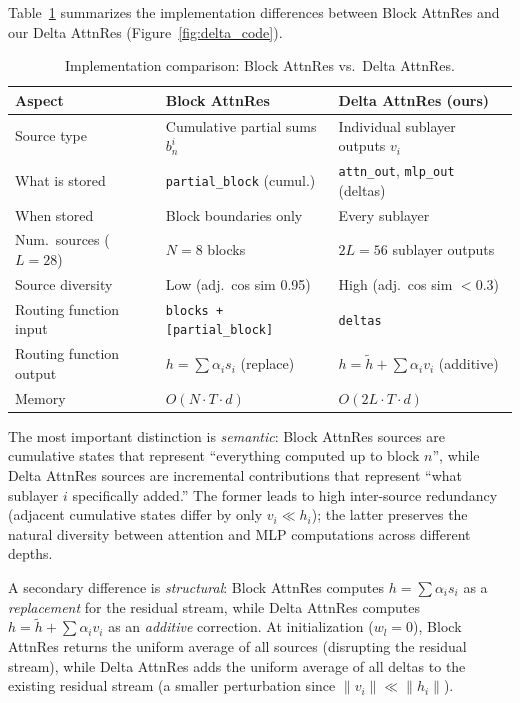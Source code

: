 \documentclass{article}
\begin{document}
Table~\ref{tab:diff} summarizes the implementation differences between Block AttnRes and our Delta AttnRes (Figure~\ref{fig:delta_code}).

\begin{table}[h]
\centering
\caption{Implementation comparison: Block AttnRes vs.\ Delta AttnRes.}
\label{tab:diff}
\begin{tabular}{lll}
\toprule
\textbf{Aspect} & \textbf{Block AttnRes} & \textbf{Delta AttnRes (ours)} \\
\midrule
Source type & Cumulative partial sums $b_n^i$ & Individual sublayer outputs $v_i$ \\
What is stored & \texttt{partial\_block} (cumul.) & \texttt{attn\_out}, \texttt{mlp\_out} (deltas) \\
When stored & Block boundaries only & Every sublayer \\
Num.\ sources ($L{=}28$) & $N{=}8$ blocks & $2L{=}56$ sublayer outputs \\
Source diversity & Low (adj.\ cos sim 0.95) & High (adj.\ cos sim $<$0.3) \\
Routing function input & \texttt{blocks + [partial\_block]} & \texttt{deltas} \\
Routing function output & $h = \sum \alpha_i s_i$ (replace) & $h = \tilde{h} + \sum \alpha_i v_i$ (additive) \\
Memory & $O(N \cdot T \cdot d)$ & $O(2L \cdot T \cdot d)$ \\
\bottomrule
\end{tabular}
\end{table}

The most important distinction is \emph{semantic}: Block AttnRes sources are cumulative states that represent ``everything computed up to block $n$'', while Delta AttnRes sources are incremental contributions that represent ``what sublayer $i$ specifically added.'' The former leads to high inter-source redundancy (adjacent cumulative states differ by only $v_i \ll h_i$); the latter preserves the natural diversity between attention and MLP computations across different depths.

A secondary difference is \emph{structural}: Block AttnRes computes $h = \sum \alpha_i s_i$ as a \emph{replacement} for the residual stream, while Delta AttnRes computes $h = \tilde{h} + \sum \alpha_i v_i$ as an \emph{additive} correction. At initialization ($w_l = 0$), Block AttnRes returns the uniform average of all sources (disrupting the residual stream), while Delta AttnRes adds the uniform average of all deltas to the existing residual stream (a smaller perturbation since $\|v_i\| \ll \|h_i\|$).
\end{document}
